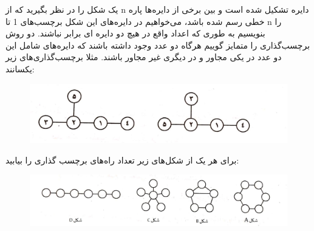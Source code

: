 \p
یک شکل را در نظر بگیرید که از n دایره تشکیل شده است و بین برخی از دایره‌ها پاره خطی رسم شده باشد، می‌خواهیم در دایره‌های این شکل برچسب‌های 1 تا n را بنویسیم 
به طوری که اعداد واقع در هیچ دو دایره ای برابر نباشند. دو روش برچسب‌گذاری را متمایز گوییم هرگاه دو عدد وجود داشته باشند که دایره‌های شامل این دو عدد در یکی مجاور و در دیگری غیر مجاور باشند.
مثلا برچسب‌گذاری‌های زیر یکسانند:

\begin{figure}[h]
\centering
\includegraphics[scale = 0.18]{./figure B.jpg}
\label{fig:mesh2}
\end{figure}

برای هر یک از شکل‌های زیر تعداد راه‌های برچسب گذاری را بیابید:

\begin{figure}[h]
\centering
\includegraphics[scale = 0.16]{./figure C.JPEG}
\label{fig:mesh3}
\end{figure}